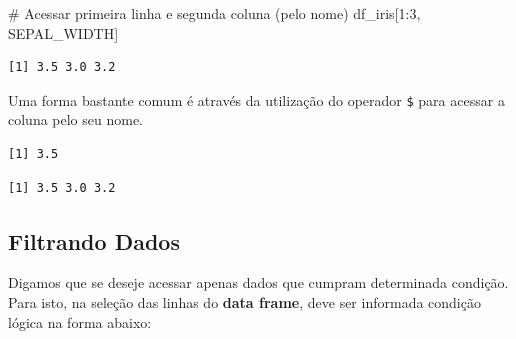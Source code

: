 \documentclass[
  letterpaper,
  DIV=11,
  numbers=noendperiod]{scrreprt}
\newenvironment{Shaded}{\begin{snugshade}}{\end{snugshade}}
\newcommand{\CommentTok}[1]{\textcolor[rgb]{0.37,0.37,0.37}{#1}}
\newcommand{\DecValTok}[1]{\textcolor[rgb]{0.68,0.00,0.00}{#1}}
\newcommand{\FloatTok}[1]{\textcolor[rgb]{0.68,0.00,0.00}{#1}}
\newcommand{\NormalTok}[1]{\textcolor[rgb]{0.00,0.23,0.31}{#1}}
\newcommand{\OtherTok}[1]{\textcolor[rgb]{0.00,0.23,0.31}{#1}}
\newcommand{\SpecialCharTok}[1]{\textcolor[rgb]{0.37,0.37,0.37}{#1}}
\newcommand{\StringTok}[1]{\textcolor[rgb]{0.13,0.47,0.30}{#1}}
\begin{document}
\begin{Shaded}
\begin{Highlighting}[]
\CommentTok{\# Acessar primeira linha e segunda coluna (pelo nome)}
\NormalTok{df\_iris[}\DecValTok{1}\SpecialCharTok{:}\DecValTok{3}\NormalTok{, }\StringTok{\textquotesingle{}SEPAL\_WIDTH\textquotesingle{}}\NormalTok{]}
\end{Highlighting}
\end{Shaded}

\begin{verbatim}
[1] 3.5 3.0 3.2
\end{verbatim}

Uma forma bastante comum é através da utilização do operador \texttt{\$}
para acessar a coluna pelo seu nome.

\begin{Shaded}
\end{Shaded}

\begin{verbatim}
[1] 3.5
\end{verbatim}

\begin{Shaded}
\end{Shaded}

\begin{verbatim}
[1] 3.5 3.0 3.2
\end{verbatim}

\hypertarget{filtrando-dados}{%
\subsection{Filtrando Dados}\label{filtrando-dados}}

Digamos que se deseje acessar apenas dados que cumpram determinada
condição. Para isto, na seleção das linhas do \textbf{data frame}, deve
ser informada condição lógica na forma abaixo:

\begin{Shaded}
\end{Shaded}
\end{document}
